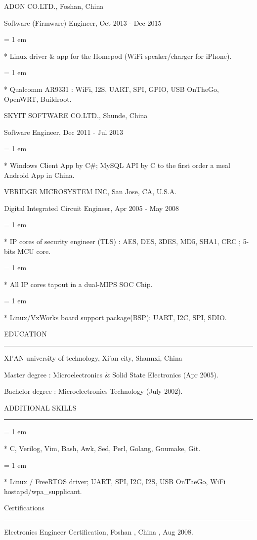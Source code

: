 { \medbreak } { \FFbg
ADON CO.LTD., Foshan, China
}

{ \FFte
Software (Firmware) Engineer, Oct 2013 - Dec 2015
}
{ \parindent = 1 em \item{*}
 Linux driver \& app for the Homepod (WiFi speaker/charger for iPhone). 
}
{ \parindent = 1 em \item{*}
 Qualcomm AR9331 : WiFi, I2S, UART, SPI, GPIO, USB OnTheGo, OpenWRT, Buildroot.
 }

{ \medbreak } { \FFbg
SKYIT SOFTWARE CO.LTD., Shunde, China
}

{ \FFte
Software Engineer, Dec 2011 - Jul 2013
}
{ \parindent = 1 em \item{*}
 Windows Client App by C\#; MySQL API by C to the first order a meal Android App in China.
 }

{ \medbreak } { \FFbg
VBRIDGE MICROSYSTEM INC, San Jose, CA, U.S.A.
}

{ \FFte
Digital Integrated Circuit Engineer, Apr 2005 - May 2008
}
{ \parindent = 1 em \item{*}
 IP cores of security engineer (TLS) :
 AES, DES, 3DES, MD5, SHA1, CRC ;
 5-bits MCU core.
 }
{ \parindent = 1 em \item{*}
All IP cores tapout in a dual-MIPS SOC Chip.
 }
{ \parindent = 1 em \item{*}
Linux/VxWorks board support package(BSP): UART, I2C, SPI, SDIO.
 }

{ \medbreak } { \FFbg
EDUCATION
}
{ \smallbreak } {\par\noindent\hrule} { \smallbreak }
XI'AN university of technology, Xi'an city, Shannxi, China

{ \FFte
Master degree : Microelectronics \& Solid State Electronics (Apr 2005).
}

{ \FFte
Bachelor degree : Microelectronics Technology (July 2002).
}

{ \medbreak } { \FFbg
ADDITIONAL SKILLS
}
{ \smallbreak } {\par\noindent\hrule} { \smallbreak }
{ \parindent = 1 em \item{*}
 C, Verilog, Vim, Bash, Awk, Sed, Perl, Golang, Gnumake, Git.
 }
{ \parindent = 1 em \item{*}
 Linux / FreeRTOS driver; UART, SPI, I2C, I2S, USB OnTheGo, WiFi hostapd/wpa\_supplicant.
 }

{ \medbreak } { \FFbg
Certifications
}
{ \smallbreak } {\par\noindent\hrule} { \smallbreak }
Electronics Engineer Certification, Foshan , China , Aug 2008.

